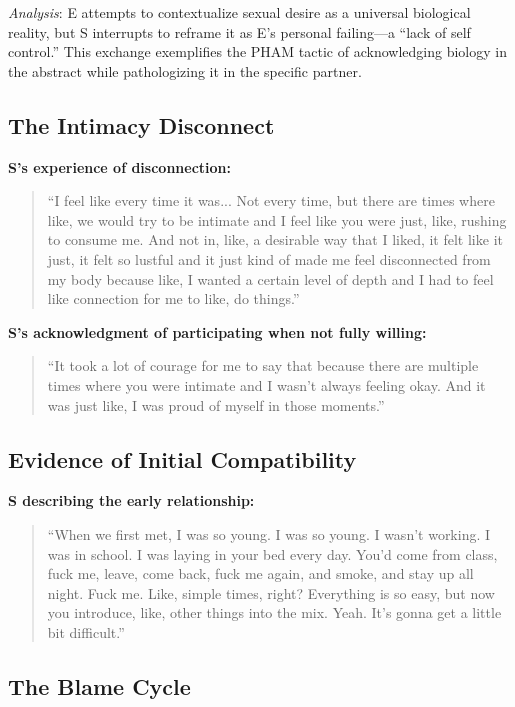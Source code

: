 \documentclass[12pt, letterpaper]{article}
\begin{document}
\textit{Analysis}: E attempts to contextualize sexual desire as a universal biological reality, but S interrupts to reframe it as E's personal failing---a ``lack of self control.'' This exchange exemplifies the PHAM tactic of acknowledging biology in the abstract while pathologizing it in the specific partner.

\subsection{The Intimacy Disconnect}

\textbf{S's experience of disconnection:}
\begin{quote}
``I feel like every time it was... Not every time, but there are times where like, we would try to be intimate and I feel like you were just, like, rushing to consume me. And not in, like, a desirable way that I liked, it felt like it just, it felt so lustful and it just kind of made me feel disconnected from my body because like, I wanted a certain level of depth and I had to feel like connection for me to like, do things.''
\end{quote}

\textbf{S's acknowledgment of participating when not fully willing:}
\begin{quote}
``It took a lot of courage for me to say that because there are multiple times where you were intimate and I wasn't always feeling okay. And it was just like, I was proud of myself in those moments.''
\end{quote}

\subsection{Evidence of Initial Compatibility}

\textbf{S describing the early relationship:}
\begin{quote}
``When we first met, I was so young. I was so young. I wasn't working. I was in school. I was laying in your bed every day. You'd come from class, fuck me, leave, come back, fuck me again, and smoke, and stay up all night. Fuck me. Like, simple times, right? Everything is so easy, but now you introduce, like, other things into the mix. Yeah. It's gonna get a little bit difficult.''
\end{quote}

\subsection{The Blame Cycle}
\end{document}
